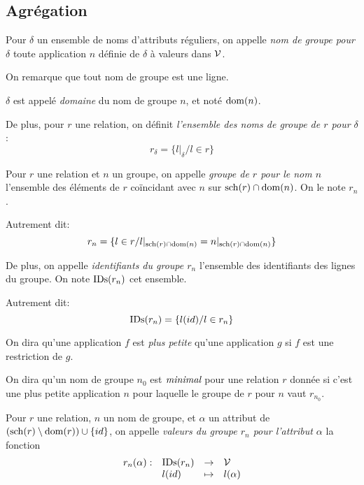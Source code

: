 \subsection*{Agrégation}

\begin{defi}
	Pour $\delta$ un ensemble de noms d'attributs réguliers,
	on appelle \emph{nom de groupe pour $\delta$}
	toute application $n$ définie de $\delta$
	à valeurs dans $\mathcal{V}$.
	
	On remarque que tout nom de groupe est une ligne.
	
	$\delta$ est appelé \emph{domaine} du nom de groupe $n$,
	et noté $\operatorname{dom}(n)$.
	
	De plus, pour $r$ une relation, on définit
	\emph{l'ensemble des noms de groupe de $r$ pour $\delta$}:
	$$
	r_\delta = \{l|_\delta / l \in r \}
	$$
\end{defi}

\begin{defi}
	Pour $r$ une relation et $n$ un groupe, on appelle
	\emph{groupe de $r$ pour le nom $n$} l'ensemble
	des éléments de $r$ coïncidant avec $n$ 
	sur $\operatorname{sch}(r)\cap\operatorname{dom}(n)$. On le note $r_n$.
	
	Autrement dit:
	$$
	r_n = \{l \in r / l|_{\operatorname{sch}(r)\cap\operatorname{dom}(n)}  = n|_{\operatorname{sch}(r)\cap\operatorname{dom}(n)} \}
	$$
	
	De plus, on appelle \emph{identifiants du groupe $r_n$} l'ensemble
	des identifiants des lignes du groupe. On note $\operatorname{IDs}(r_n)$ cet ensemble.
	
	Autrement dit:
	$$
	\operatorname{IDs}(r_n) = \{ l(id) / l \in r_n \}
	$$
\end{defi}

\begin{defi}
	On dira qu'une application $f$ est \emph{plus petite}
	qu'une application $g$ si $f$ est une restriction de $g$.
	
	On dira qu'un nom de groupe $n_0$ est $\emph{minimal}$
	pour une relation $r$ donnée
	si c'est une plus petite application $n$ pour laquelle
	le groupe de $r$ pour $n$ vaut $r_{n_0}$.
\end{defi}

\begin{defi}
	Pour $r$ une relation, $n$ un nom de groupe,
	et $\alpha$ un attribut de
	$(\operatorname{sch}(r) \setminus \operatorname{dom}(r)) \cup \{id\}$,
	on appelle \emph{valeurs du groupe $r_n$ pour
		l'attribut $\alpha$}
	la fonction
	$$
	\begin{array}{llcl}
	r_n(\alpha) : & \operatorname{IDs}(r_n) & \rightarrow & \mathcal{V} \\
			& l(id) & \mapsto & l(\alpha)
	\end{array}
	$$
\end{defi}
	
